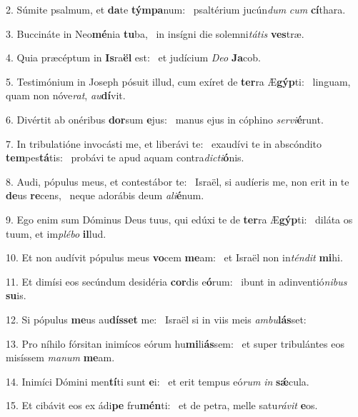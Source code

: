 2. Súmite psalmum, et \textbf{da}te \textbf{tým}\textbf{pa}num: \ast\  psaltérium jucún\textit{dum} \textit{cum} \textbf{cí}thara.\

3. Buccináte in Neo\textbf{mé}nia \textbf{tu}ba, \ast\  in insígni die solemni\textit{tá}\textit{tis} \textbf{ves}træ.\

4. Quia præcéptum in \textbf{Is}ra\textbf{ël} est: \ast\  et judícium \textit{De}\textit{o} \textbf{Ja}cob.\

5. Testimónium in Joseph pósuit illud, cum exíret de \textbf{ter}ra Æ\textbf{gýp}ti: \ast\  linguam, quam non nóve\textit{rat}, \textit{au}\textbf{dí}vit.\

6. Divértit ab onéribus \textbf{dor}sum \textbf{e}jus: \ast\  manus ejus in cóphino \textit{ser}\textit{vi}\textbf{é}runt.\

7. In tribulatióne invocásti me, et liberávi te: \dag\  exaudívi te in abscóndito \textbf{tem}pes\textbf{tá}tis: \ast\  probávi te apud aquam contra\textit{dic}\textit{ti}\textbf{ó}nis.\

8. Audi, pópulus meus, et contestábor te: \dag\  Israël, si audíeris me, non erit in te \textbf{de}us \textbf{re}cens, \ast\  neque adorábis deum \textit{a}\textit{li}\textbf{é}num.\

9. Ego enim sum Dóminus Deus tuus, qui edúxi te de \textbf{ter}ra Æ\textbf{gýp}ti: \ast\  diláta os tuum, et im\textit{plé}\textit{bo} \textbf{il}lud.\

10. Et non audívit pópulus meus \textbf{vo}cem \textbf{me}am: \ast\  et Israël non in\textit{tén}\textit{dit} \textbf{mi}hi.\

11. Et dimísi eos secúndum desidéria \textbf{cor}dis e\textbf{ó}rum: \ast\  ibunt in adinventió\textit{ni}\textit{bus} \textbf{su}is.\

12. Si pópulus \textbf{me}us au\textbf{dís}\textbf{set} me: \ast\  Israël si in viis meis \textit{am}\textit{bu}\textbf{lás}set:\

13. Pro níhilo fórsitan inimícos eórum hu\textbf{mi}li\textbf{ás}sem: \ast\  et super tribulántes eos misíssem \textit{ma}\textit{num} \textbf{me}am.\

14. Inimíci Dómini men\textbf{tí}ti sunt \textbf{e}i: \ast\  et erit tempus eó\textit{rum} \textit{in} \textbf{sǽ}cula.\

15. Et cibávit eos ex ádi\textbf{pe} fru\textbf{mén}ti: \ast\  et de petra, melle satu\textit{rá}\textit{vit} \textbf{e}os.\


